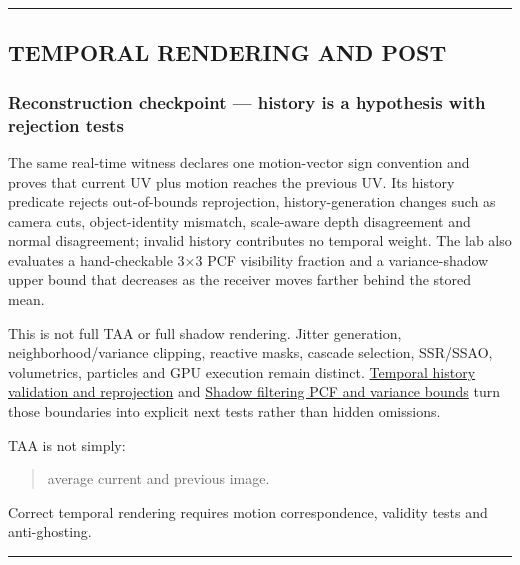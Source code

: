 \begin{center}\rule{0.5\linewidth}{0.5pt}\end{center}

\subsection{TEMPORAL RENDERING AND POST}\label{04-visual-computing-ii-ch040-temporal-rendering-and-post}

\hypertarget{04-visual-computing-ii-ch040-temporal-rendering-and-post}{}

\subsubsection{Reconstruction checkpoint --- history is a hypothesis with rejection tests}\label{04-visual-computing-ii-ch040-reconstruction-checkpoint-history-is-a-hypothesis-with-rejection-tests}

\hypertarget{04-visual-computing-ii-ch040-reconstruction-checkpoint-history-is-a-hypothesis-with-rejection-tests}{}

The same real-time witness declares one motion-vector sign convention and proves that current UV plus motion reaches the previous UV. Its history predicate rejects out-of-bounds reprojection, history-generation changes such as camera cuts, object-identity mismatch, scale-aware depth disagreement and normal disagreement; invalid history contributes no temporal weight. The lab also evaluates a hand-checkable 3×3 PCF visibility fraction and a variance-shadow upper bound that decreases as the receiver moves farther behind the stored mean.

This is not full TAA or full shadow rendering. Jitter generation, neighborhood/variance clipping, reactive masks, cascade selection, SSR/SSAO, volumetrics, particles and GPU execution remain distinct. \hyperref[appendix-e8c352e39466]{Temporal history validation and reprojection} and \hyperref[appendix-7cac8a689849]{Shadow filtering PCF and variance bounds} turn those boundaries into explicit next tests rather than hidden omissions.

TAA is not simply:

\begin{quote}
average current and previous image.
\end{quote}

Correct temporal rendering requires motion correspondence, validity tests and anti-ghosting.

\begin{center}\rule{0.5\linewidth}{0.5pt}\end{center}

